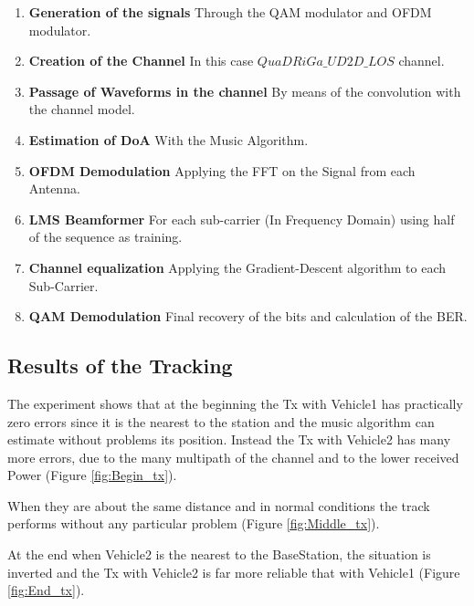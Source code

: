 \begin{enumerate}
    \item \textbf{Generation of the signals} Through the QAM modulator and OFDM modulator. 
    \item \textbf{Creation of the Channel} In this case $QuaDRiGa\_UD2D\_LOS$ channel.
    \item \textbf{Passage of Waveforms in the channel} By means of the convolution with the channel model.
    \item \textbf{Estimation of DoA} With the Music Algorithm.
    \item \textbf{OFDM Demodulation} Applying the FFT on the Signal from each Antenna.
    \item \textbf{LMS Beamformer} For each sub-carrier (In Frequency Domain) using half of the sequence as training.
    \item \textbf{Channel equalization} Applying the Gradient-Descent algorithm to each Sub-Carrier.
    \item \textbf{QAM Demodulation} Final recovery of the bits and calculation of the BER.
\end{enumerate}


\subsection{Results of the Tracking}

The experiment shows that at the beginning the Tx with Vehicle1 has practically zero errors since it is the nearest to the station
and the music algorithm can estimate without problems its position. Instead the Tx with Vehicle2 has many more errors, due to 
the many multipath of the channel and to the lower received Power (Figure \ref{fig:Begin_tx}).

When they are about the same distance and in normal conditions the track performs without any particular problem (Figure \ref{fig:Middle_tx}).

At the end when Vehicle2 is the nearest to the BaseStation, the situation is inverted and the Tx with Vehicle2 is far more 
reliable that with Vehicle1 (Figure \ref{fig:End_tx}).

